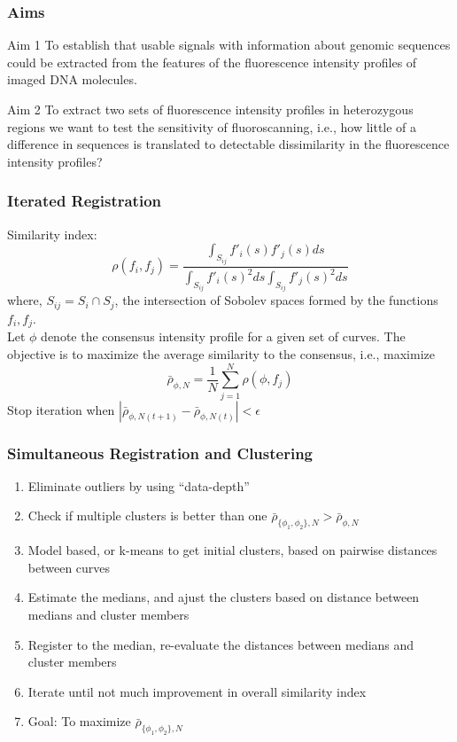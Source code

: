 \documentclass[10pt,dvipsnames,table]{beamer}
\begin{document}
\begin{frame}
\frametitle{Aims}
\begin{block}{Aim 1}
To establish that usable signals with information about genomic sequences could be extracted from the features of the fluorescence intensity profiles of imaged DNA molecules.
\end{block}

\begin{block}{Aim 2}
To extract two sets of fluorescence intensity profiles in heterozygous regions we want to test the sensitivity of fluoroscanning, i.e., how little of a difference in sequences is translated to detectable dissimilarity in the fluorescence intensity profiles?
\end{block}
\end{frame}

\begin{frame}
\frametitle{Iterated Registration}
Similarity index:
\[ \rho(f_i, f_j) = \frac{\int _{S_{ij}}f'_i(s)f'_j(s) ds}{\int _{S_{ij}}f'_i(s)^2 ds \int _{S_{ij}}f'_j(s)^2 ds} \]
where, $S_{ij} = S_i \cap S_j$, the intersection of Sobolev spaces formed by the functions $f_i, f_j$.\\

Let $\phi$ denote the consensus intensity profile for a given set of curves. The objective is to maximize the average similarity to the consensus, i.e., maximize
\[ \bar{\rho}_{\phi, N} = \frac{1}{N} \sum \limits_{j = 1}^{N} \rho(\phi, f_j)\]
Stop iteration when $|\bar{\rho}_{\phi, N (t+1)} - \bar{\rho}_{\phi, N (t)} | < \epsilon$
\end{frame}


\begin{frame}
\frametitle{Simultaneous Registration and Clustering}
\begin{enumerate}
\item Eliminate outliers by using ``data-depth''
\item Check if multiple clusters is better than one $\bar{\rho}_{\{\phi_1, \phi_2\}, N} > \bar{\rho}_{\phi, N}$
\item Model based, or k-means to get initial clusters, based on pairwise distances between curves
\item Estimate the medians, and ajust the clusters based on distance between medians and cluster members
\item Register to the median, re-evaluate the distances between medians and cluster members
\item Iterate until not much improvement in overall similarity index
\item Goal: To maximize $\bar{\rho}_{\{\phi_1, \phi_2\}, N}$
\end{enumerate}
\end{frame}
\end{document}
